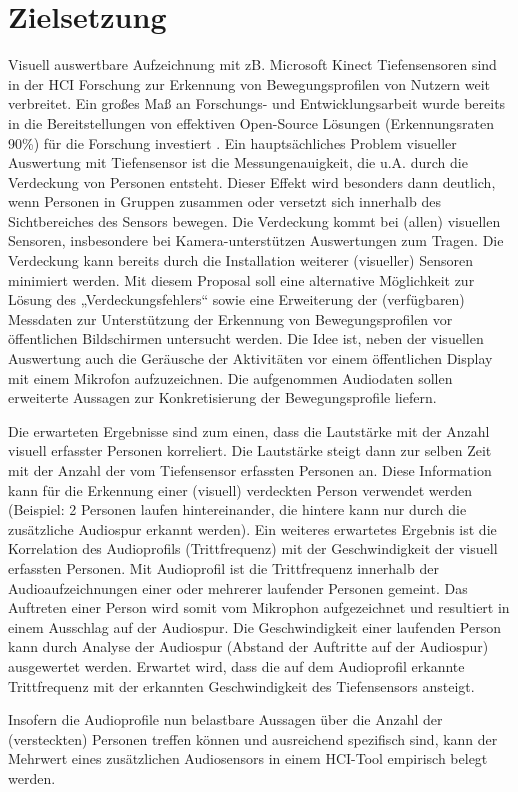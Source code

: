 \chapter{Zielsetzung}

Visuell auswertbare Aufzeichnung mit zB. Microsoft Kinect Tiefensensoren sind in der HCI Forschung zur Erkennung von Bewegungsprofilen von Nutzern weit verbreitet. Ein großes Maß an Forschungs- und Entwicklungsarbeit wurde bereits in die Bereitstellungen von effektiven Open-Source L\"osungen (Erkennungsraten ~ 90\%) für die Forschung investiert \cite{Elhart}. Ein haupts\"achliches Problem visueller Auswertung mit Tiefensensor ist die Messungenauigkeit, die u.A. durch die Verdeckung von Personen entsteht. Dieser Effekt wird besonders dann deutlich, wenn Personen in Gruppen zusammen oder versetzt sich innerhalb des Sichtbereiches des Sensors bewegen. Die Verdeckung kommt bei (allen) visuellen Sensoren, insbesondere bei Kamera-unterstützen Auswertungen zum Tragen. Die Verdeckung kann bereits durch die Installation weiterer (visueller) Sensoren minimiert werden. Mit diesem Proposal soll eine alternative M\"oglichkeit zur L\"osung des „Verdeckungsfehlers“ sowie eine Erweiterung der (verf\"ugbaren) Messdaten zur Unterst\"utzung der Erkennung von Bewegungsprofilen vor \"offentlichen Bildschirmen untersucht werden. Die Idee ist, neben der visuellen Auswertung auch die Ger\"ausche der Aktivit\"aten vor einem \"offentlichen Display mit einem Mikrofon aufzuzeichnen. Die aufgenommen Audiodaten sollen erweiterte Aussagen zur Konkretisierung der Bewegungsprofile liefern.

Die erwarteten Ergebnisse sind zum einen, dass die Lautst\"arke mit der Anzahl visuell erfasster Personen korreliert. Die Lautst\"arke steigt dann zur selben Zeit mit der Anzahl der vom Tiefensensor erfassten Personen an. Diese Information kann f\"ur die Erkennung einer (visuell) verdeckten Person verwendet werden (Beispiel: 2 Personen laufen hintereinander, die hintere kann nur durch die zus\"atzliche Audiospur erkannt werden). Ein weiteres erwartetes Ergebnis ist die Korrelation des Audioprofils (Trittfrequenz) mit der Geschwindigkeit der visuell erfassten Personen. Mit Audioprofil ist die Trittfrequenz innerhalb der Audioaufzeichnungen einer oder mehrerer laufender Personen gemeint. Das Auftreten einer Person wird somit vom Mikrophon aufgezeichnet und resultiert in einem Ausschlag auf der Audiospur. Die Geschwindigkeit einer laufenden Person kann durch Analyse der Audiospur (Abstand der Auftritte auf der Audiospur) ausgewertet werden. Erwartet wird, dass die auf dem Audioprofil erkannte Trittfrequenz mit der erkannten Geschwindigkeit des Tiefensensors ansteigt. 

Insofern die Audioprofile nun belastbare Aussagen über die Anzahl der (versteckten) Personen treffen k\"onnen und ausreichend spezifisch sind, kann der Mehrwert eines zusätzlichen Audiosensors in einem HCI-Tool empirisch belegt werden.


